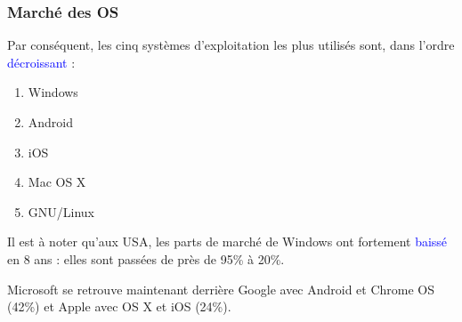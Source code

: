 \documentclass[aspectratio=169]{beamer}
\begin{document}
\begin{frame}
  \frametitle{Marché  des OS}
  Par conséquent, les cinq systèmes d'exploitation les plus utilisés sont, dans
l'ordre \textcolor{blue}{décroissant} :

  \begin{enumerate}
  \item Windows

  \item Android

  \item iOS

  \item Mac OS X

  \item GNU/Linux
  \end{enumerate}

        Il est à noter qu'aux USA, les parts de marché de Windows ont fortement
\textcolor{blue}{baissé} en 8 ans : elles sont passées de près de 95\% à 20\%.

  \hspace{0.5cm}

  Microsoft se retrouve maintenant derrière Google avec Android et Chrome OS
(42\%) et Apple avec OS X et iOS (24\%).
\end{frame}
\end{document}
